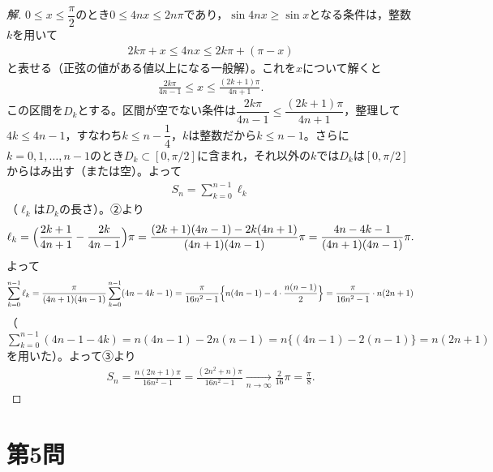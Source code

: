 \documentclass[../main.tex]{subfiles}
\begin{document}
\begin{proof}[解]
  $0\le x\le\dfrac\pi2$のとき$0\le4nx\le2n\pi$であり，$\sin4nx\ge\sin x$となる条件は，整数$k$を用いて
  \begin{align*}
    2k\pi+x\le4nx\le2k\pi+(\pi-x)
  \end{align*}
  と表せる（正弦の値がある値以上になる一般解）。これを$x$について解くと
  \begin{align*}
    \frac{2k\pi}{4n-1}\le x\le\frac{(2k+1)\pi}{4n+1}.\tag{②}
  \end{align*}
  この区間を$D_k$とする。区間が空でない条件は$\dfrac{2k\pi}{4n-1}\le\dfrac{(2k+1)\pi}{4n+1}$，整理して$4k\le4n-1$，すなわち$k\le n-\dfrac14$，$k$は整数だから$k\le n-1$。さらに$k=0,1,\dots,n-1$のとき$D_k\subset[0,\pi/2]$に含まれ，それ以外の$k$では$D_k$は$[0,\pi/2]$からはみ出す（または空）。よって
  \begin{align*}
    S_n=\sum_{k=0}^{n-1}\ell_k\tag{③}
  \end{align*}
  （$\ell_k$は$D_k$の長さ）。②より
  \begin{align*}
    \ell_k=\Bigl(\frac{2k+1}{4n+1}-\frac{2k}{4n-1}\Bigr)\pi=\frac{(2k+1)(4n-1)-2k(4n+1)}{(4n+1)(4n-1)}\pi=\frac{4n-4k-1}{(4n+1)(4n-1)}\pi.
  \end{align*}
  よって
  \begin{align*}
    \sum_{k=0}^{n-1}\ell_k=\frac{\pi}{(4n+1)(4n-1)}\sum_{k=0}^{n-1}(4n-4k-1)=\frac{\pi}{16n^2-1}\Bigl\{n(4n-1)-4\cdot\frac{n(n-1)}2\Bigr\}=\frac{\pi}{16n^2-1}\cdot n(2n+1)
  \end{align*}
  （$\sum_{k=0}^{n-1}(4n-1-4k)=n(4n-1)-2n(n-1)=n\{(4n-1)-2(n-1)\}=n(2n+1)$を用いた）。よって③より
  \begin{align*}
    S_n=\frac{n(2n+1)\pi}{16n^2-1}=\frac{(2n^2+n)\pi}{16n^2-1}\xrightarrow[n\to\infty]{}\frac{2}{16}\pi=\frac\pi8.
  \end{align*}
\end{proof}

\newpage

\section*{第5問}
\end{document}
